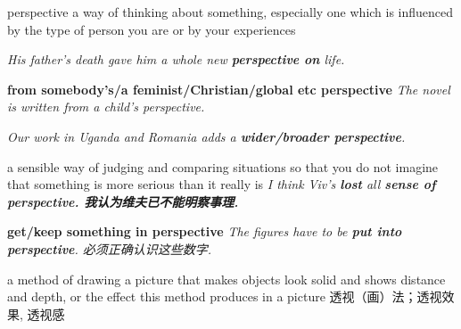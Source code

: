 \begin{DefWord}{perspective}
    a way of thinking about something, especially one which is influenced by the type of person you are or by your experiences

    \textit{His father's death gave him a whole new \textbf{perspective on} life.}
    
    \textbf{from somebody's/a feminist/Christian/global etc perspective}
    \textit{The novel is written from a child's perspective.}

    \textit{Our work in Uganda and Romania adds a \textbf{wider/broader perspective}.}

    a sensible way of judging and comparing situations so that you do not imagine that something is more serious than it really is
    \textit{I think Viv's \textbf{lost} all \textbf{sense of perspective. 我认为维夫已不能明察事理. }}

    \textbf{get/keep something in perspective}
    \textit{The figures have to be \textbf{put into perspective}. 必须正确认识这些数字. }

    a method of drawing a picture that makes objects look solid and shows distance and depth, or the effect this method produces in a picture 透视（画）法；透视效果, 透视感
\end{DefWord}

